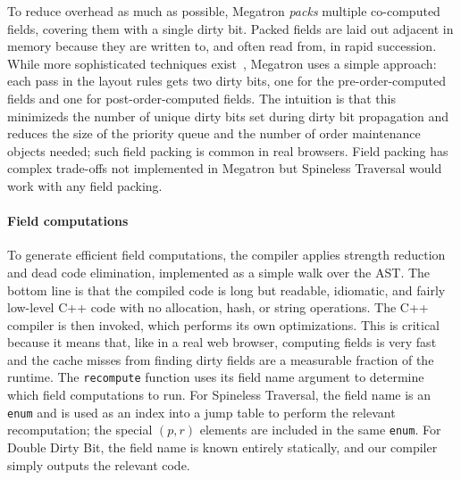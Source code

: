 To reduce overhead as much as possible,
  Megatron \emph{packs} multiple co-computed fields,
  covering them with a single dirty bit.
Packed fields are laid out adjacent in memory
  because they are written to, and often read from,
  in rapid succession.
While more sophisticated techniques exist~\cite{yufeng-2},
  Megatron uses a simple approach:
  each pass in the layout rules gets two dirty bits,
  one for the pre-order-computed fields
  and one for post-order-computed fields.
The intuition is that this minimizeds
  the number of unique dirty bits
  set during dirty bit propagation
  and reduces the size of the priority queue
  and the number of order maintenance objects needed;
  such field packing is common in real browsers.
Field packing has complex trade-offs
  not implemented in Megatron
  but Spineless Traversal would work
  with any field packing.

\paragraph{Field computations}
To generate efficient field computations,
  the compiler applies strength reduction and dead code elimination,
  implemented as a simple walk over the AST.
The bottom line is that the compiled code is
  long but readable, idiomatic, and fairly low-level C++ code
  with no allocation, hash, or string operations.
The C++ compiler is then invoked, which performs its own optimizations.
This is critical because it means that,
  like in a real web browser,
  computing fields is very fast
  and the cache misses from finding dirty fields
  are a measurable fraction of the runtime.
The \texttt{recompute} function uses its field name argument
  to determine which field computations to run.
For Spineless Traversal,
  the field name is an \texttt{enum}
  and is used as an index into a jump table
  to perform the relevant recomputation;
  the special $(p, r)$ elements are included
  in the same \texttt{enum}.
For Double Dirty Bit, the field name is known
  entirely statically, and our compiler
  simply outputs the relevant code.